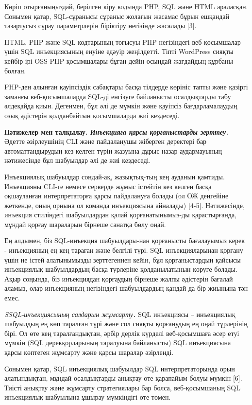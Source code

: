 \begin{multicols}{2}

Көріп отырғаныңыздай, берілген кіру кодында PHP, SQL және HTML
араласқан. Сонымен қатар, SQL-сұранысы сұраныс жолағын жасамас бұрын
ешқандай тазартусыз сұрау параметрлерін біріктіру негізінде жасалады
{[}3{]}.

HTML, PHP және SQL кодтарының тоғысуы PHP негізіндегі веб-қосымшалар
үшін SQL инъекциясының енуіне едәуір жеңілдетті. Тіпті WordPress сияқты
кейбір ірі OSS PHP қосымшалары бұған дейін осындай жағдайдың құрбаны
болған.

PHP-ден алынған қауіпсіздік сабақтары басқа тілдерде көрініс тапты және
қазіргі заманғы веб-қосымшаларда SQL-ді енгізуге байланысты осалдықтарды
табу әлдеқайда қиын. Дегенмен, бұл әлі де мүмкін және қауіпсіз
бағдарламалаудың озық әдістерін қолданбайтын қосымшаларда жиі кездеседі.

{\bfseries Нәтижелер мен талқылау. \emph{Инъекцияға қарсы қорғаныстарды
зерттеу.}} Әдетте әзірлеушінің CLI және пайдаланушы жіберген деректері
бар автоматтандырудың кез келген түрін жазуына дұрыс назар аудармауының
нәтижесінде бұл шабуылдар әлі де жиі кездеседі.

Инъекциялық шабуылдар сондай-ақ, жазықтық-тың кең ауданын қамтиды.
Инъекцияны CLI-ге немесе серверде жұмыс істейтін кез келген басқа
оқшауланған интерпретаторға қарсы пайдалануға болады (ол ОЖ деңгейіне
жеткенде, оның орнына ол команда инъекциясына айналады) {[}4-5{]}.
Нәтижесінде, инъекция стиліндегі шабуылдардан қалай қорғанатынымыз-ды
қарастырғанда, мұндай қорғау шараларын бірнеше санатқа бөлу оңай.

Ең алдымен, біз SQL-инъекция шабуылдары-нан қорғанысты бағалауымыз керек
- инъекцияның ең кең тараған және белгілі түрі. SQL инъекцияларынан
қорғану үшін не істей алатынымызды зерттегеннен кейін, бұл
қорғаныстардың қайсысы инъекциялық шабуылдардың басқа түрлеріне
қолданылатынын көруге болады. Ақыр соңында, біз инъекциядан қорғаудың
бірнеше жалпы әдістерін бағалай аламыз, олар инъекцияның негізіндегі
шабуылдардың қандай да бір жиынына тән емес.

\emph{SSQL-инъекциясының салдарын жұмсарту{\bfseries . }}SQL инъекциясы --
инъекциялық шабуылдың ең көп таралған түрі және сол сияқты қорғанудың ең
оңай түрлерінің бірі. Ол өте кең таралғандықтан, әрбір дерлік күрделі
веб-қосымшаға әсер етуі мүмкін (SQL дерекқорларының таралуына
байланысты) SQL инъекциясына қарсы көптеген жұмсарту және қарсы шаралар
әзірленді.

Сонымен қатар, SQL инъекциялық шабуылдар SQL интерпретаторында орын
алатындықтан, мұндай осалдықтарды анықтау өте қарапайым болуы мүмкін
{[}6{]}. Тиісті анықтау және жұмсарту стратегиялары бар болса,
веб-қосымшаның SQL инъекциялық шабуылына ұшырау мүмкіндігі өте төмен.


\end{multicols}
